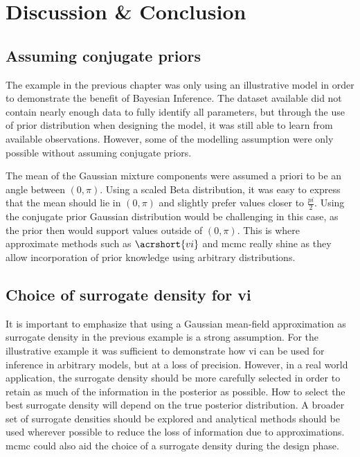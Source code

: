 \chapter{Discussion \& Conclusion}\label{chap:discussion}

\section{Assuming conjugate priors}\label{sec:discuss_conjugate_priors}
The example in the previous chapter was only using an illustrative model in order to demonstrate the benefit of Bayesian Inference. The dataset available did not contain nearly enough data to fully identify all parameters, but through the use of prior distribution when designing the model, it was still able to learn from available observations. However, some of the modelling assumption were only possible without assuming conjugate priors.

The mean of the Gaussian mixture components were assumed a priori to be an angle between $(0, \pi)$. Using a scaled Beta distribution, it was easy to express that the mean should lie in $(0, \pi)$ and slightly prefer values closer to $\frac{pi}{2}$. Using the conjugate prior Gaussian distribution would be challenging in this case, as the prior then would support values outside of $(0, \pi)$. This is where approximate methods such as $\acrshort{vi}$ and \acrshort{mcmc} really shine as they allow incorporation of prior knowledge using arbitrary distributions.  

\section{Choice of surrogate density for \acrshort{vi}}
It is important to emphasize that using a Gaussian mean-field approximation as surrogate density in the previous example is a strong assumption. For the illustrative example it was sufficient to demonstrate how \acrshort{vi} can be used for inference in arbitrary models, but at a loss of precision. However, in a real world application, the surrogate density should be more carefully selected in order to retain as much of the information in the posterior as possible. How to select the best surrogate density will depend on the true posterior distribution. A broader set of surrogate densities should be explored and analytical methods should be used wherever possible to reduce the loss of information due to approximations. \acrshort{mcmc} could also aid the choice of a surrogate density during the design phase.

